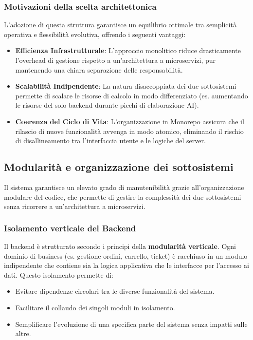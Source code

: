 \documentclass[a4paper, 11pt, oneside]{scrartcl}
\begin{document}
\subsubsection{Motivazioni della scelta architettonica}
L'adozione di questa struttura garantisce un equilibrio ottimale tra semplicità operativa e flessibilità evolutiva, offrendo i seguenti vantaggi:
\begin{itemize}
    \item \textbf{Efficienza Infrastrutturale}: L'approccio monolitico riduce drasticamente l'overhead di gestione rispetto a un'architettura a
     microservizi, pur mantenendo una chiara separazione delle responsabilità.
    \item \textbf{Scalabilità Indipendente}: La natura disaccoppiata dei due sottosistemi permette di scalare le risorse di calcolo in modo
     differenziato (es. aumentando le risorse del solo backend durante picchi di elaborazione AI).
    \item \textbf{Coerenza del Ciclo di Vita}: L'organizzazione in Monorepo assicura che il rilascio di nuove funzionalità avvenga in modo atomico,
     eliminando il rischio di disallineamento tra l'interfaccia utente e le logiche del server.
\end{itemize}

\subsection{Modularità e organizzazione dei sottosistemi}
Il sistema garantisce un elevato grado di manutenibilità grazie all'organizzazione modulare del codice, che permette di gestire la complessità dei
      due sottosistemi senza ricorrere a un'architettura a microservizi.

\subsubsection{Isolamento verticale del Backend}
Il backend è strutturato secondo i principi della \textbf{modularità verticale}. Ogni dominio di business (es. gestione ordini, carrello, ticket) è
      racchiuso in un modulo indipendente che contiene sia la logica applicativa che le interfacce per l'accesso ai dati. Questo isolamento permette di:
\begin{itemize}
    \item Evitare dipendenze circolari tra le diverse funzionalità del sistema.
    \item Facilitare il collaudo dei singoli moduli in isolamento.
    \item Semplificare l'evoluzione di una specifica parte del sistema senza impatti sulle altre.
\end{itemize}
\end{document}

